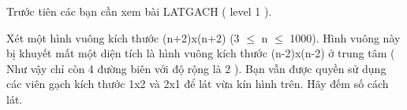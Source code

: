 Trước tiên các bạn cần xem bài LATGACH ( level 1 ).   


   Xét một hình vuông kích thước (n+2)x(n+2) (3 $\le$ n $\le$ 1000). Hình vuông này bị khuyết mất một diện tích là hình vuông kích thước (n-2)x(n-2) ở trung tâm ( Như vậy chỉ còn 4 đường biên với độ rộng là 2 ). Bạn vẫn được quyền sử dụng các viên gạch kích thước 1x2 và 2x1 để lát vừa kín hình trên. Hãy đếm số cách lát.